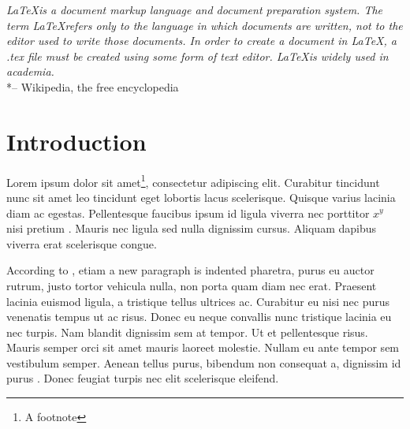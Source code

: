 \documentclass[12pt,a4paper]{article}
\author{}
\title{}
\date{}
\begin{document}
\onehalfspacing


\newpage

\setcounter{tocdepth}{3}

\pagestyle{empty}

\tableofcontents            
\vspace{1cm} 
\listoffigures
\newpage

\vspace*{5mm}
\singlespacing 
\noindent
\large \textit
{
  \LaTeX is a document markup language and document preparation
  system. The term \LaTeX refers only to the language in which
  documents are written, not to the editor used to write those
  documents. In order to create a document in \LaTeX, a .tex file must
  be created using some form of text editor.
  \LaTeX is widely used in academia.
}\\*-- Wikipedia, the free encyclopedia
\normalsize
\onehalfspacing

\newpage
\pagestyle{plain}
\setcounter{page}{1} 


\section{Introduction}
\label{sec:intro}
Lorem ipsum dolor sit amet\footnote{A footnote}, consectetur
adipiscing elit. Curabitur tincidunt nunc sit amet leo tincidunt eget
lobortis lacus scelerisque. Quisque varius lacinia diam ac
egestas. Pellentesque faucibus ipsum id ligula viverra nec porttitor
$x^y$ nisi pretium \cite{Tutorsen2011}. Mauris nec ligula sed nulla
dignissim cursus. Aliquam dapibus viverra erat scelerisque congue.

According to , etiam a new paragraph is indented
pharetra, purus eu auctor rutrum, justo tortor vehicula nulla, non
porta quam diam nec erat. Praesent lacinia euismod ligula, a tristique
tellus ultrices ac. Curabitur eu nisi nec purus venenatis tempus ut ac
risus. Donec eu neque convallis nunc tristique lacinia eu nec
turpis. Nam blandit dignissim sem at tempor. Ut et pellentesque
risus. Mauris semper orci sit amet mauris laoreet molestie. Nullam eu
ante tempor sem vestibulum semper. Aenean tellus purus, bibendum non
consequat a, dignissim id purus \cite[p.\ 35]{Musterman2009}. Donec
feugiat turpis nec elit scelerisque eleifend.
\end{document}
